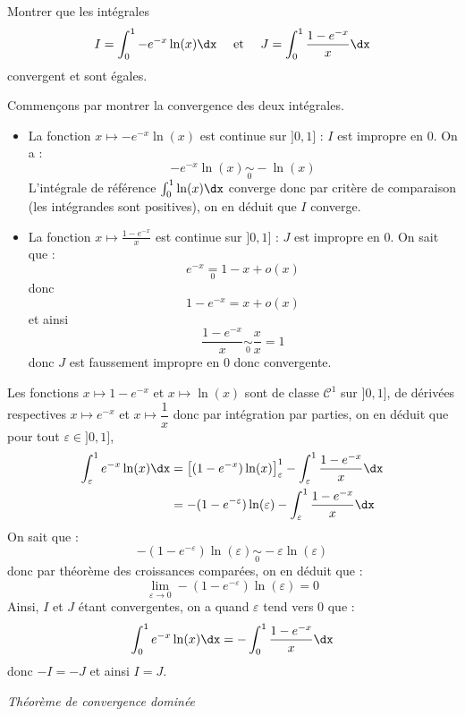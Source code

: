\documentclass[a4paper,10pt]{report}
\begin{document}
\begin{Exercice}{} Montrer que les intégrales 
$$ I=\int_{0}^1 -e^{-x} \ln(x) \dx \quad \hbox{ et } \quad J= \int_{0}^1 \frac{1-e^{-x}}{x} \dx$$
convergent et sont égales.
\end{Exercice}

\corr Commençons par montrer la convergence des deux intégrales.

\begin{itemize}
\item La fonction $x \mapsto -e^{-x} \ln(x)$ est continue sur $]0,1]$ : $I$ est impropre en $0$. On a :
$$  -e^{-x} \ln(x) \underset{0}{\sim} -\ln(x)$$
L'intégrale de référence $\int_0^1 \ln(x) \dx$ converge donc par critère de comparaison (les intégrandes sont positives), on en déduit que $I$ converge.
\item La fonction $x \mapsto \frac{1-e^{-x}}{x}$ est continue sur $]0,1]$ : $J$ est impropre en $0$. On sait que :
$$ e^{-x} \underset{0}{=} 1-x + o(x) $$
donc 
$$ 1-e^{-x} = x + o(x)$$
et ainsi 
$$ \frac{1-e^{-x}}{x} \underset{0}{\sim} \dfrac{x}{x}= 1$$
donc $J$ est faussement impropre en $0$ donc convergente.
\end{itemize}
 Les fonctions $x \mapsto 1-e^{-x}$ et $x \mapsto \ln(x)$ sont de classe $\mathcal{C}^1$ sur $]0,1]$, de dérivées respectives $x \mapsto e^{-x}$ et $x \mapsto \dfrac{1}{x}$ donc par intégration par parties, on en déduit que pour tout $\varepsilon \in ]0,1]$,
\begin{align*}
\int_{\varepsilon}^1 e^{-x} \ln(x) \dx & = \left[(1-e^{-x}) \ln(x) \right]_{\varepsilon}^1  - \int_{\varepsilon}^1 \dfrac{1-e^{-x}}{x} \dx \\
& = - (1-e^{-\varepsilon}) \ln(\varepsilon)  - \int_{\varepsilon}^1 \dfrac{1-e^{-x}}{x} \dx \\
\end{align*}
On sait que :
$$ - (1-e^{-\varepsilon}) \ln(\varepsilon) \underset{0}{\sim} - \varepsilon \ln(\varepsilon)$$
donc par théorème des croissances comparées, on en déduit que :
$$ \lim_{\varepsilon \rightarrow 0}  - (1-e^{-\varepsilon}) \ln(\varepsilon) = 0$$
Ainsi, $I$ et $J$ étant convergentes, on a quand $\varepsilon$ tend vers $0$ que :
$$ \int_{0}^1 e^{-x} \ln(x) \dx =  - \int_{0}^1 \dfrac{1-e^{-x}}{x} \dx $$
donc $-I=-J$ et ainsi $I=J$.



\medskip

\begin{center}
\textit{{ {\large Théorème de convergence dominée}}}
\end{center}
\end{document}
